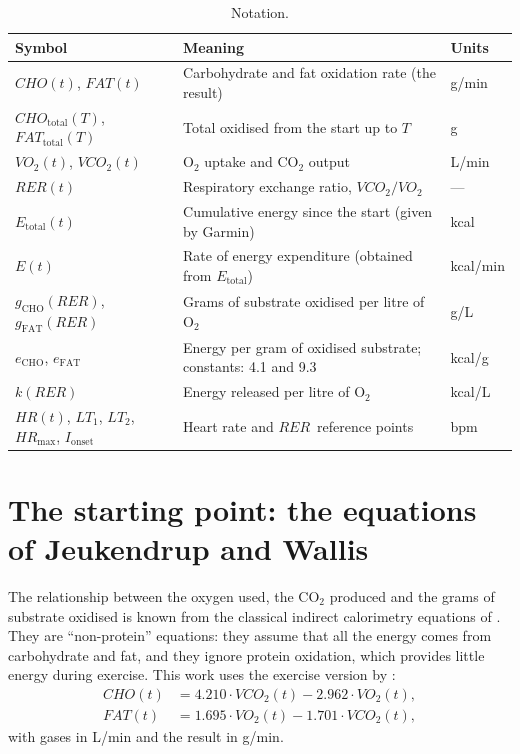 \documentclass[10pt,a4paper]{article}
\newcommand{\sub}[1]{{\scriptscriptstyle\mathrm{#1}}}   %
\newcommand{\CHO}{\sub{CHO}}
\newcommand{\FAT}{\sub{FAT}}
\newcommand{\tot}{\sub{total}}
\newcommand{\smax}{{\scriptscriptstyle\text{max}}}
\newcommand{\cho}{\ensuremath{\mathit{CHO}}}               %
\newcommand{\fat}{\ensuremath{\mathit{FAT}}}
\newcommand{\VO}{\ensuremath{\mathit{VO}_2}}               %
\newcommand{\VCO}{\ensuremath{\mathit{VCO}_2}}
\newcommand{\RER}{\ensuremath{\mathit{RER}}}
\newcommand{\FC}{\ensuremath{\mathit{HR}}}
\newcommand{\FCmax}{\ensuremath{\mathit{HR}_{\smax}}}
\newcommand{\Ion}{\ensuremath{I_{\mathrm{onset}}}}
\begin{document}
\begin{table}[H]
\centering
\caption{Notation.}
\label{tab:notacio}
\small
\begin{tabularx}{\textwidth}{@{}l L l@{}}
\toprule
Symbol & Meaning & Units \\
\midrule
$\cho(t)$, $\fat(t)$ & Carbohydrate and fat oxidation rate (the result) & g/min \\
$\cho_{\tot}(T)$, $\fat_{\tot}(T)$ & Total oxidised from the start up to $T$ & g \\
$\VO(t)$, $\VCO(t)$ & O$_2$ uptake and CO$_2$ output & L/min \\
$\RER(t)$ & Respiratory exchange ratio, $\VCO/\VO$ & --- \\
$E_{\tot}(t)$ & Cumulative energy since the start (given by Garmin) & kcal \\
$E(t)$ & Rate of energy expenditure (obtained from $E_{\tot}$) & kcal/min \\
$g_{\CHO}(\RER)$, $g_{\FAT}(\RER)$ & Grams of substrate oxidised per litre of O$_2$ & g/L \\
$e_{\CHO}$, $e_{\FAT}$ & Energy per gram of oxidised substrate; constants: 4.1 and 9.3 & kcal/g \\
$k(\RER)$ & Energy released per litre of O$_2$ & kcal/L \\
$\FC(t)$, $LT_1$, $LT_2$, $\FCmax$, $\Ion$ & Heart rate and \RER\ reference points & bpm \\
\bottomrule
\end{tabularx}
\end{table}

\section{The starting point: the equations of Jeukendrup and Wallis}\label{sec:jw}

The relationship between the oxygen used, the CO$_2$ produced and the grams of substrate
oxidised is known from the classical indirect calorimetry equations of
\citet{frayn1983}. They are ``non-protein'' equations: they assume that all the energy comes
from carbohydrate and fat, and they ignore protein oxidation, which provides little energy
during exercise. This work uses the exercise version by \citet{jeukendrup2005}:
\begin{align}
  \cho(t) &= 4.210\cdot\VCO(t)-2.962\cdot\VO(t), \label{eq:jw-cho}\\
  \fat(t) &= 1.695\cdot\VO(t)-1.701\cdot\VCO(t), \label{eq:jw-fat}
\end{align}
with gases in L/min and the result in g/min.
\end{document}
